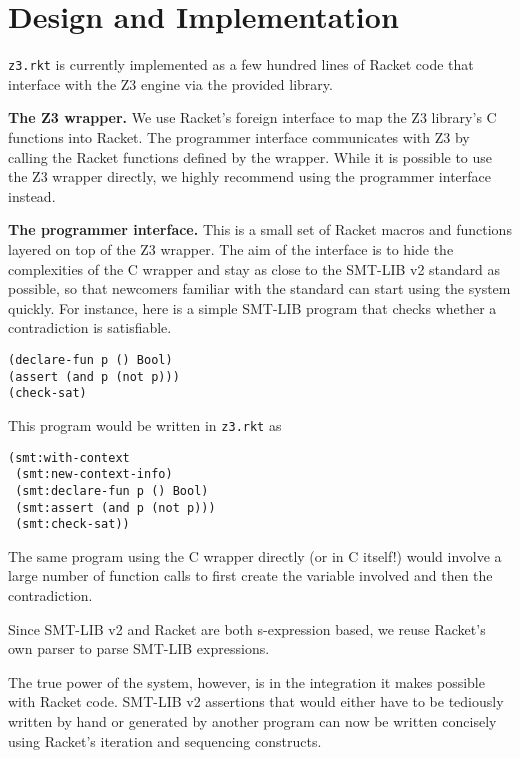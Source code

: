 \section{Design and Implementation}

\texttt{z3.rkt} is currently implemented as a few hundred lines of Racket code
that interface with the Z3 engine via the provided library.

\textbf{The Z3 wrapper.} We use Racket's foreign interface \cite{racket/foreign}
to map the Z3 library's C functions into Racket. The programmer interface
communicates with Z3 by calling the Racket functions defined by the
wrapper. While it is possible to use the Z3 wrapper directly, we highly
recommend using the programmer interface instead.

\textbf{The programmer interface.} This is a small set of Racket macros and
functions layered on top of the Z3 wrapper. The aim of the interface is to hide
the complexities of the C wrapper and stay as close to the SMT-LIB v2 standard
\cite{smtlib2:10} as possible, so that newcomers familiar with the standard can
start using the system quickly. For instance, here is a simple SMT-LIB program
that checks whether a contradiction is satisfiable.

\begin{verbatim}
(declare-fun p () Bool)
(assert (and p (not p)))
(check-sat)
\end{verbatim}

This program would be written in \texttt{z3.rkt} as

\begin{verbatim}
(smt:with-context
 (smt:new-context-info)
 (smt:declare-fun p () Bool)
 (smt:assert (and p (not p)))
 (smt:check-sat))
\end{verbatim}

The same program using the C wrapper directly (or in C itself!) would involve a
large number of function calls to first create the variable involved and then
the contradiction.

Since SMT-LIB v2 and Racket are both s-expression based, we reuse Racket's own
parser to parse SMT-LIB expressions.

The true power of the system, however, is in the integration it makes possible
with Racket code. SMT-LIB v2 assertions that would either have to be tediously
written by hand or generated by another program can now be written concisely
using Racket's iteration and sequencing constructs.

